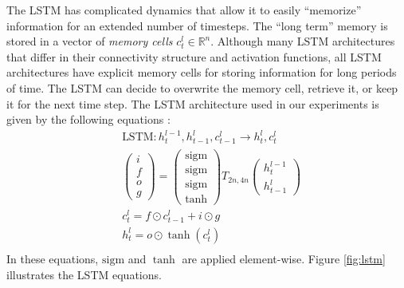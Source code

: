 \documentclass{article}
\begin{document}
The LSTM has complicated dynamics that allow it to
easily ``memorize'' information for an extended number of timesteps.  The
``long term'' memory is stored in a vector of \emph{memory cells}
$c^l_t \in \mathbb{R}^n$.  Although many LSTM architectures
that differ in their connectivity structure and activation functions,
all LSTM architectures have explicit memory cells for storing
information for long periods of time.  The LSTM can decide
to overwrite the memory cell, retrieve it, or keep it for the next time
step.  The LSTM architecture used in our experiments is given by the
following equations \cite{graves2013speech}:
\begin{align*}
&\text{LSTM} : h^{l-1}_t, h^l_{t-1}, c^l_{t - 1} \rightarrow h^l_t, c^l_t\\
&\begin{pmatrix}i\\f\\o\\g\end{pmatrix} =
  \begin{pmatrix}\mathrm{sigm}\\\mathrm{sigm}\\\mathrm{sigm}\\\tanh\end{pmatrix}
  T_{2n,4n}\begin{pmatrix}h^{l - 1}_t\\h^l_{t-1}\end{pmatrix}\\
&c^l_t = f \odot c^l_{t-1} + i \odot g\\
&h^l_t = o \odot \tanh(c^l_t)\\
\end{align*}
In these equations, $\mathrm{sigm}$ and $\tanh$ are applied
element-wise. Figure \ref{fig:lstm} illustrates the LSTM
equations.
\end{document}
